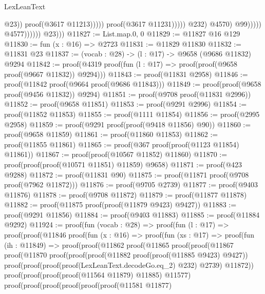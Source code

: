 \begin{lexlean}{LexLeanText}
\begin{coremodule}
                                                                    @23))
                                                              proof(@3617 @11213)))))
                                                    proof(@3617 @11231)))))
                                        @232)
                                      @4570)
                                    @99)))))
                        @4577))))))
          @23)))
@11827 := List.map.{0, 0}
@11829 := @11827 @16 @129
@11830 := fun (x : @16) => @2723
@11831 := @11829 @11830
@11832 := @11831 @23
@11837 := (vocab : @28) -> (l : @17) -> @9658 (@9686 @11832) @9294
@11842 := proof(@4319 proof(fun (l : @17) => proof(proof(@9658 proof(@9667 @11832)) @9294)))
@11843 := proof(@11831 @2958)
@11846 := proof(@11842 proof(@9664 proof(@9686 @11843)))
@11849 := proof(proof(@9658 proof(@9456 @11832)) @9294)
@11851 := proof(@9708 proof(@11831 @2996))
@11852 := proof(@9658 @11851)
@11853 := proof(@9291 @2996)
@11854 := proof(@11852 @11853)
@11855 := proof(@1111 @11854)
@11856 := proof(@2995 @2958)
@11859 := proof(@9291 proof(proof(@9418 @11856) @90))
@11860 := proof(@9658 @11859)
@11861 := proof(@11860 @11853)
@11862 := proof(@11855 @11861)
@11865 := proof(@367 proof(proof(@1123 @11854) @11861))
@11867 := proof(proof(@10567 @11852) @11860)
@11870 := proof(proof(proof(@10571 @11851) @11859) @9658)
@11871 := proof(@423 @9288)
@11872 := proof(@11831 @90)
@11875 := proof(@11871 proof(@9708 proof(@7962 @11872)))
@11876 := proof(@9705 @2739)
@11877 := proof(@9403 @11876)
@11878 := proof(@9708 @11872)
@11879 := proof(@11877 @11878)
@11882 := proof(@11875 proof(proof(@11879 @9423) @9427))
@11883 := proof(@9291 @11856)
@11884 := proof(@9403 @11883)
@11885 := proof(@11884 @9292)
@11924 := proof(fun (vocab : @28) =>
    proof(fun (l : @17) =>
      proof(proof(@11846
            proof(fun (x : @16) =>
              proof(fun (xs : @17) =>
                proof(fun (ih : @11849) =>
                  proof(proof(@11862
                        proof(@11865
                            proof(proof(@11867
                                  proof(@11870
                                      proof(proof(proof(@11882 proof(proof(@11885 @9423) @9427))
                                            proof(proof(proof(proof(LexLeanText.decodeGo.eq_2) @232)
                                                  @2739)
                                                @11872))
                                          proof(proof(proof(proof(@11564 @11879) @11885) @11577)
                                              proof(proof(proof(proof(proof(proof(@11581 @11877)

\end{coremodule}
\end{lexlean}
